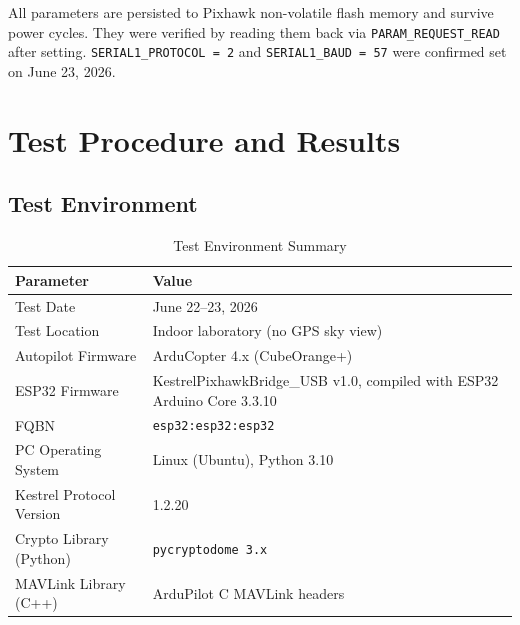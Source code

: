 \documentclass[11pt,a4paper]{article}
\begin{document}
\begin{notebox}
    All parameters are persisted to Pixhawk non-volatile flash memory and
    survive power cycles. They were verified by reading them back via
    \texttt{PARAM\_REQUEST\_READ} after setting. \texttt{SERIAL1\_PROTOCOL = 2}
    and \texttt{SERIAL1\_BAUD = 57} were confirmed set on June 23, 2026.
\end{notebox}

\newpage

\section{Test Procedure and Results}
\label{sec:testing}

\subsection{Test Environment}

\begin{table}[H]
    \centering
    \begin{tabularx}{\textwidth}{@{}lX@{}}
        \toprule
        \textbf{Parameter}      & \textbf{Value} \\
        \midrule
        Test Date               & June 22--23, 2026 \\
        Test Location           & Indoor laboratory (no GPS sky view) \\
        Autopilot Firmware      & ArduCopter 4.x (CubeOrange+) \\
        ESP32 Firmware          & KestrelPixhawkBridge\_USB v1.0,
                                  compiled with ESP32 Arduino Core 3.3.10 \\
        FQBN                    & \texttt{esp32:esp32:esp32} \\
        PC Operating System     & Linux (Ubuntu), Python 3.10 \\
        Kestrel Protocol Version & 1.2.20 \\
        Crypto Library (Python) & \texttt{pycryptodome 3.x} \\
        MAVLink Library (C++)   & ArduPilot C MAVLink headers \\
        \bottomrule
    \end{tabularx}
    \caption{Test Environment Summary}
\end{table}
\end{document}
